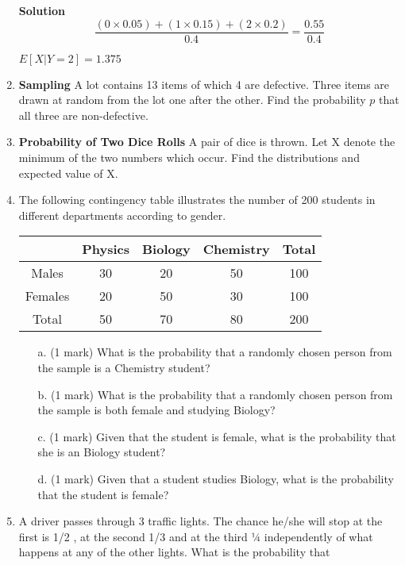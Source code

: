\documentclass[a4paper,12pt]{article}
\begin{document}
\begin{enumerate}
\begin{framed}
\textbf{Solution}
\[   \frac{(0 \times 0.05) + (1 \times 0.15)+(2 \times 0.2) }{0.4}  = \frac{0.55}{0.4}  \] 

$E[X|Y=2] = 1.375$
\end{framed}


\item \textbf{Sampling}
A lot contains 13 items of which 4 are defective. Three items are drawn at random from the lot one after the other. Find the probability $p$ that all three are non-defective.



\item \textbf{Probability of Two Dice Rolls}
A pair of dice is thrown. Let X denote the minimum of the two numbers which occur.
Find the distributions and expected value of X.

\item The following contingency table illustrates the number of 200 students in different
departments according to gender.

\begin{center}
\begin{tabular}{|c|c|c|c|c|}
\hline
& Physics & Biology & Chemistry & Total \\\hline
Males & 30 & 20 & 50 & 100 \\  \hline
Females & 20 & 50 & 30 & 100 \\ \hline
Total & 50 & 70 & 80 & 200 \\
\hline
\end{tabular}
\end{center}

\begin{itemize}
\item[a.] (1 mark) What is the probability that a randomly chosen person from the sample is a
Chemistry student?
\item[b.] (1 mark) What is the probability that a randomly chosen person from the sample is both female and studying Biology?
\item[c.] (1 mark) Given that the student is female, what is the probability that she is an
Biology student?
\item[d.] (1 mark) Given that a student studies Biology, what is the probability that the student is female?
\end{itemize}


\item
A driver passes through 3 traffic lights. The chance he/she will stop at the first is 1/2 , at the second 1/3 and at the third ¼ independently of what happens at any of the other lights. What is the probability that


\end{enumerate}
\end{document}
